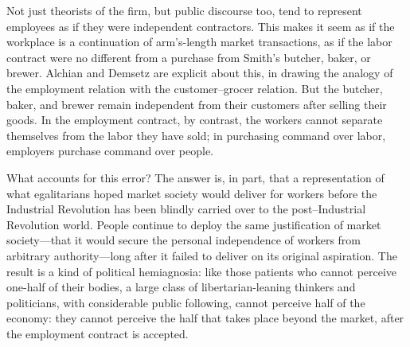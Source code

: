 \documentclass[
  letterpaper,
  11pt,
  DIV=9,
  openright]{scrbook}
\begin{document}
Not just theorists of the firm, but public discourse too, tend to
represent employees as if they were independent contractors. This makes
it seem as if the workplace is a continuation of arm's-length market
transactions, as if the labor contract were no different from a purchase
from Smith's butcher, baker, or brewer. Alchian and Demsetz are explicit
about this, in drawing the analogy of the employment relation with the
customer--grocer relation. But the butcher, baker, and brewer remain
independent from their customers after selling their goods. In the
employment contract, by contrast, the workers cannot separate themselves
from the labor they have sold; in purchasing command over labor,
employers purchase command over people.

What accounts for this error? The answer is, in part, that a
representation of what egalitarians hoped market society would deliver
for workers before the Industrial Revolution has been blindly carried
over to the post--Industrial Revolution world. People continue to deploy
the same justification of market society---that it would secure the
personal independence of workers from arbitrary authority---long after
it failed to deliver on its original aspiration. The result is a kind of
political hemiagnosia: like those patients who cannot perceive one-half
of their bodies, a large class of libertarian-leaning thinkers and
politicians, with considerable public following, cannot perceive half of
the economy: they cannot perceive the half that takes place beyond the
market, after the employment contract is accepted.

\end{document}

